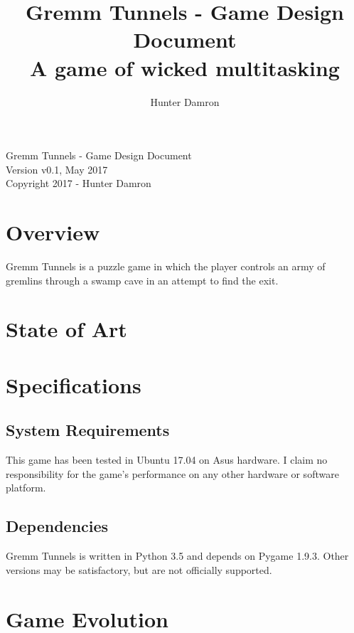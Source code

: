 \documentclass{scrreprt}
\title{
	Gremm Tunnels - Game Design Document \\
    \large A game of wicked multitasking
}
\author{Hunter Damron}
\begin{document}
	\maketitle
	
	\null\vfill
	\noindent
	Gremm Tunnels - Game Design Document \\
	Version v0.1, May 2017 \\
	Copyright 2017 - Hunter Damron \\
	\newpage

	\tableofcontents
	\newpage
	
	\chapter{Overview}
		Gremm Tunnels is a puzzle game in which the player controls an army of gremlins through a swamp cave in an attempt to find the exit.
	
	\chapter{State of Art}
	
	\chapter{Specifications}
		\section{System Requirements}
			This game has been tested in Ubuntu 17.04 on Asus hardware. I claim no responsibility for the game's performance on any other hardware or software platform.
		
		\section{Dependencies}
			Gremm Tunnels is written in Python 3.5 and depends on Pygame 1.9.3. Other versions may be satisfactory, but are not officially supported.
			
	
	\chapter{Game Evolution}
			
\end{document}
